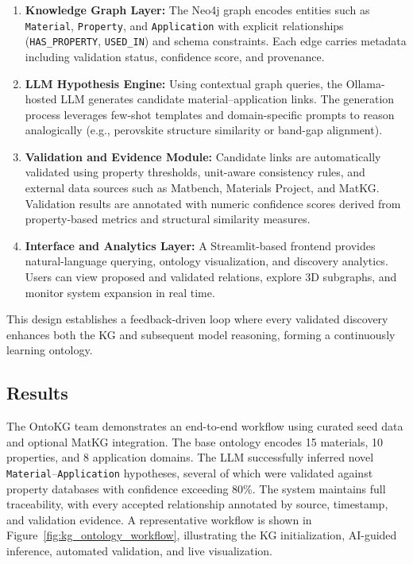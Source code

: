 \begin{enumerate}
    \item \textbf{Knowledge Graph Layer:} The Neo4j graph encodes entities such as \texttt{Material}, \texttt{Property}, and \texttt{Application} with explicit relationships (\texttt{HAS\_PROPERTY}, \texttt{USED\_IN}) and schema constraints. Each edge carries metadata including validation status, confidence score, and provenance.
    \item \textbf{LLM Hypothesis Engine:} Using contextual graph queries, the Ollama-hosted LLM generates candidate material–application links. The generation process leverages few-shot templates and domain-specific prompts to reason analogically (e.g., perovskite structure similarity or band-gap alignment).
    \item \textbf{Validation and Evidence Module:} Candidate links are automatically validated using property thresholds, unit-aware consistency rules, and external data sources such as Matbench, Materials Project, and MatKG. Validation results are annotated with numeric confidence scores derived from property-based metrics and structural similarity measures.
    \item \textbf{Interface and Analytics Layer:} A Streamlit-based frontend provides natural-language querying, ontology visualization, and discovery analytics. Users can view proposed and validated relations, explore 3D subgraphs, and monitor system expansion in real time.
\end{enumerate}

This design establishes a feedback-driven loop where every validated discovery enhances both the KG and subsequent model reasoning, forming a continuously learning ontology.

\subsection*{Results}

The OntoKG team demonstrates an end-to-end workflow using curated seed data and optional MatKG integration. The base ontology encodes 15 materials, 10 properties, and 8 application domains. The LLM successfully inferred novel \texttt{Material}–\texttt{Application} hypotheses, several of which were validated against property databases with confidence exceeding 80\%. The system maintains full traceability, with every accepted relationship annotated by source, timestamp, and validation evidence. A representative workflow is shown in Figure~\ref{fig:kg_ontology_workflow}, illustrating the KG initialization, AI-guided inference, automated validation, and live visualization.

